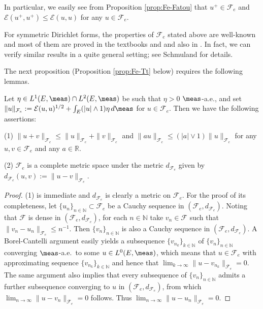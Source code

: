 %
In particular, we easily see from Proposition \ref{prop:Fe-Fatou} that
$u^{+}\in\mathcal{F}_{e}$ and $\mathcal{E}(u^{+},u^{+})\leq\mathcal{E}(u,u)$
for any $u\in\mathcal{F}_{e}$.
%
\begin{remn}
For symmetric Dirichlet forms, the properties of $\mathcal{F}_{e}$ stated above are well-known
and most of them are proved in the textbooks \cite[Section 1.1]{CF} and \cite[Section 4.1]{FT}
and also in \cite[Section 1]{F:Fe}. In fact, we can verify similar results in a quite general
setting; see Schmuland \cite{Sch:extend} for details.
\end{remn}
%
%
The next proposition (Proposition \ref{prop:Fe-Tt} below) requires the following lemmas.
%
\begin{lem}\label{lem:Fe-norm}
Let $\eta\in L^{1}(E,\meas)\cap L^{2}(E,\meas)$ be such that $\eta>0$ $\meas$-a.e.,
and set
$\|u\|_{\mathcal{F}_{e}}:=\mathcal{E}(u,u)^{1/2}+\int_{E}(|u|\wedge 1)\eta\,d\meas$
for $u\in\mathcal{F}_{e}$. Then we have the following assertions:

\noindent
\textup{(1)} $\|u+v\|_{\mathcal{F}_{e}}\leq\|u\|_{\mathcal{F}_{e}}+\|v\|_{\mathcal{F}_{e}}$
and $\|au\|_{\mathcal{F}_{e}}\leq(|a|\vee 1)\|u\|_{\mathcal{F}_{e}}$
for any $u,v\in\mathcal{F}_{e}$ and any $a\in\mathbb{R}$.

\noindent
\textup{(2)} $\mathcal{F}_{e}$ is a complete metric space under the metric
$d_{\mathcal{F}_{e}}$ given by
$d_{\mathcal{F}_{e}}(u,v):=\|u-v\|_{\mathcal{F}_{e}}$.
\end{lem}
%
\begin{proof}
(1) is immediate and $d_{\mathcal{F}_{e}}$ is clearly a metric on $\mathcal{F}_{e}$.
For the proof of its completeness,
let $\{u_{n}\}_{n\in\mathbb{N}}\subset\mathcal{F}_{e}$
be a Cauchy sequence in $(\mathcal{F}_{e},d_{\mathcal{F}_{e}})$.
Noting that $\mathcal{F}$ is dense in $(\mathcal{F}_{e},d_{\mathcal{F}_{e}})$,
for each $n\in\mathbb{N}$ take $v_{n}\in\mathcal{F}$ such that
$\|v_{n}-u_{n}\|_{\mathcal{F}_{e}}\leq n^{-1}$. Then
$\{v_{n}\}_{n\in\mathbb{N}}$ is also a Cauchy sequence in
$(\mathcal{F}_{e},d_{\mathcal{F}_{e}})$.
A Borel-Cantelli argument easily yields a subsequence
$\{v_{n_{k}}\}_{k\in\mathbb{N}}$ of $\{v_{n}\}_{n\in\mathbb{N}}$
converging $\meas$-a.e.\ to some $u\in L^{0}(E,\meas)$, which means that
$u\in\mathcal{F}_{e}$ with approximating sequence
$\{v_{n_{k}}\}_{k\in\mathbb{N}}$ and hence that
$\lim_{k\to\infty}\|u-v_{n_{k}}\|_{\mathcal{F}_{e}}=0$.
The same argument also implies that every subsequence of $\{v_{n}\}_{n\in\mathbb{N}}$
admits a further subsequence converging to $u$ in
$(\mathcal{F}_{e},d_{\mathcal{F}_{e}})$,
from which $\lim_{n\to\infty}\|u-v_{n}\|_{\mathcal{F}_{e}}=0$ follows.
Thus $\lim_{n\to\infty}\|u-u_{n}\|_{\mathcal{F}_{e}}=0$.
\end{proof}
